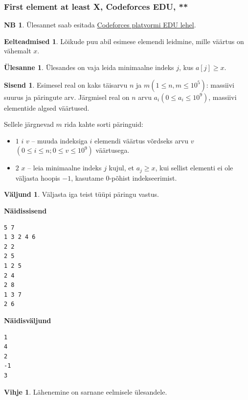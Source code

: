 \documentclass{trkut}
\theoremstyle{definition}
\newtheorem*{prereq}{Eelteadmised}
\newtheorem*{extra}{NB}
\newtheorem*{vihje}{Vihje}
\newtheorem*{Input}{Sisend}
\newtheorem*{Output}{Väljund}
\newtheorem*{Text}{Ülesanne}
\begin{document}
\subsubsection{First element at least X, Codeforces EDU, **}
\begin{extra}
Ülesannet saab esitada \href{https://codeforces.com/edu/course/2/lesson/4/2/practice/contest/273278/problem/C}{Codeforces platvormi EDU lehel}.
\end{extra}
\begin{prereq}
Lõikude puu abil esimese elemendi leidmine, mille väärtus on vähemalt $x$.
\end{prereq}
\begin{Text}
Ülesandes on vaja leida minimaalne indeks $j$, kus $a[j]\ge x$.

\parencite{14.1}
\end{Text}

\begin{Input}
Esimesel real on kaks täisarvu $n$ ja $m$$(1\le n,m\le 10^5)$: massiivi suurus ja päringute arv. Järgmisel real on $n$ arvu $a_i$$(0\le a_i\le 10^9)$, massiivi elementide algsed väärtused. 

Sellele järgnevad $m$ rida kahte sorti päringuid:
\begin{itemize}
    \item $1$ $i$ $v$ -- muuda indeksiga $i$ elemendi väärtus võrdseks arvu $v$$(0\le i\le n; 0\le v\le 10^9)$ väärtusega.
    \item $2$ $x$ -- leia minimaalne indeks $j$ kujul, et $a_j\geq x$, kui sellist elementi ei ole väljasta hoopis $-1$, kasutame 0-põhist indekseerimist. 
\end{itemize}
\end{Input}
\begin{Output}
Väljasta iga teist tüüpi päringu vastus.
\end{Output}


\textbf{Näidissisend}

\begin{verbatim}
5 7
1 3 2 4 6
2 2
2 5
1 2 5
2 4
2 8
1 3 7
2 6
\end{verbatim}

\textbf{Näidisväljund}

\begin{verbatim}
1
4
2
-1
3
\end{verbatim}


\begin{vihje}
Lähenemine on sarnane eelmisele ülesandele.
\end{vihje}
\end{document}
